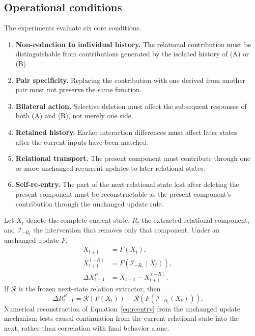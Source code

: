\documentclass[11pt,a4paper]{article}
\begin{document}
\subsection{Operational conditions}

The experiments evaluate six core conditions.

\begin{enumerate}
  \item \textbf{Non-reduction to individual history.} The relational contribution must be distinguishable from contributions generated by the isolated history of (A) or (B).
  \item \textbf{Pair specificity.} Replacing the contribution with one derived from another pair must not preserve the same function.
  \item \textbf{Bilateral action.} Selective deletion must affect the subsequent responses of both (A) and (B), not merely one side.
  \item \textbf{Retained history.} Earlier interaction differences must affect later states after the current inputs have been matched.
  \item \textbf{Relational transport.} The present component must contribute through one or more unchanged recurrent updates to later relational states.
  \item \textbf{Self-re-entry.} The part of the next relational state lost after deleting the present component must be reconstructable as the present component's contribution through the unchanged update rule.
\end{enumerate}

Let $X_t$ denote the complete current state, $R_t$ the extracted relational component, and $\mathcal I_{-R_t}$ the intervention that removes only that component. Under an unchanged update $F$,
\begin{align}
 X_{t+1} &= F(X_t),\\
 X^{(-R)}_{t+1} &= F(\mathcal I_{-R_t}(X_t)),\\
 \Delta X^{R}_{t+1} &= X_{t+1}-X^{(-R)}_{t+1}.
 \label{eq:delta}
\end{align}
If \(\mathcal R\) is the frozen next-state relation extractor, then
\begin{equation}
 \Delta R^{R}_{t+1}
 = \mathcal R(F(X_t))
 - \mathcal R(F(\mathcal I_{-R_t}(X_t))).
 \label{eq:reentry}
\end{equation}
Numerical reconstruction of Equation~\eqref{eq:reentry} from the unchanged update mechanism tests causal continuation from the current relational state into the next, rather than correlation with final behavior alone.
\end{document}
